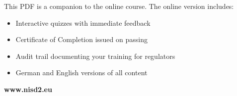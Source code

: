 \documentclass[11pt,a4paper,twoside]{book}
\begin{document}
This PDF is a companion to the online course. The online version includes:
\begin{itemize}
  \item Interactive quizzes with immediate feedback
  \item Certificate of Completion issued on passing
  \item Audit trail documenting your training for regulators
  \item German and English versions of all content
\end{itemize}

\textbf{www.nisd2.eu}

\vspace{1cm}
\begin{center}
\end{center}
\end{document}
